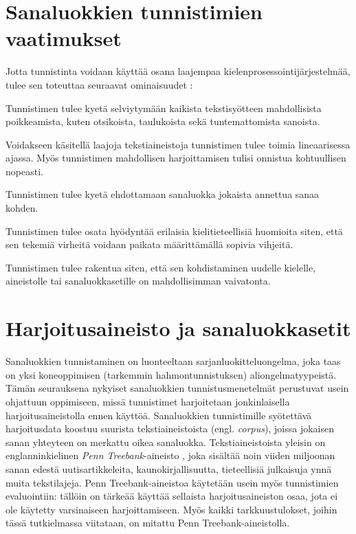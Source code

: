 \documentclass[utf8,bachelor,manualbib]{gradu3}
\begin{document}
\section{Sanaluokkien tunnistimien vaatimukset}

Jotta tunnistinta voidaan käyttää osana laajempaa kielenprosessointijärjestelmää, tulee sen toteuttaa seuraavat ominaisuudet \citep{cutting1992}:

\begin{description}[labelindent=1cm]
 \item[Kestävyys] Tunnistimen tulee kyetä selviytymään kaikista tekstisyötteen mahdollisista poikkeamista, kuten otsikoista, taulukoista sekä tuntemattomista sanoista.
 \item[Tehokkuus] Voidakseen käsitellä laajoja tekstiaineistoja tunnistimen tulee toimia lineaarisessa ajassa. Myös tunnistimen mahdollisen harjoittamisen tulisi onnistua kohtuullisen nopeasti.
 \item[Tarkkuus] Tunnistimen tulee kyetä ehdottamaan sanaluokka jokaista annettua sanaa kohden.
 \item[Viritettävyys] Tunnistimen tulee osata hyödyntää erilaisia kielitieteellisiä huomioita siten, että sen tekemiä virheitä voidaan paikata määrittämällä sopivia vihjeitä.
 \item[Uudelleenkäytettävyys] Tunnistimen tulee rakentua siten, että sen kohdistaminen uudelle kielelle, aineistolle tai sanaluokkasetille on mahdollisimman vaivatonta.
\end{description}

\section{Harjoitusaineisto ja sanaluokkasetit}

Sanaluokkien tunnistaminen on luonteeltaan sarjanluokitteluongelma, joka taas on yksi koneoppimisen (tarkemmin hahmontunnistuksen) aliongelmatyypeistä. Tämän seurauksena nykyiset sanaluokkien tunnistusmenetelmät perustuvat usein ohjattuun oppimiseen, missä tunnistimet harjoitetaan jonkinlaisella harjoitusaineistolla ennen käyttöä. Sanaluokkien tunnistimille syötettävä harjoitusdata koostuu suurista tekstiaineistoista (engl. \textit{corpus}), joissa jokaisen sanan yhteyteen on merkattu oikea sanaluokka. Tekstiaineistoista yleisin on englanninkielinen \textit{Penn Treebank}-aineisto \citep{marcus1993}, joka sisältää noin viiden miljoonan sanan edestä uutisartikkeleita, kaunokirjallisuutta, tieteellisiä julkaisuja ynnä muita tekstilajeja. Penn Treebank-aineistoa käytetään usein myös tunnistimien evaluointiin: tällöin on tärkeää käyttää sellaista harjoitusaineiston osaa, jota ei ole käytetty varsinaiseen harjoittamiseen. Myös kaikki tarkkuustulokset, joihin tässä tutkielmassa viitataan, on mitattu Penn Treebank-aineistolla.
\end{document}
